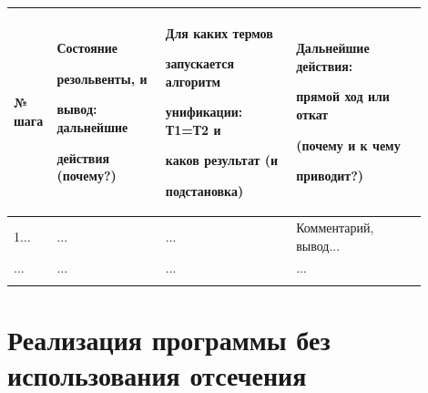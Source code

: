 \documentclass[a4paper,12pt]{article}
\begin{document}
	
	\begin{center}
	
	\begin{longtable}[h!]{|p{0.05\linewidth}|p{0.25\linewidth}|p{ 0.3\linewidth}|p{ 0.3\linewidth}|}
	
		\hline
	
		{№ шага} & {Состояние 
	
			
	
			резольвенты, и 
	
			
	
			вывод: дальнейшие 
	
			
	
			действия (почему?)} & {Для каких термов 
	
			
	
			запускается алгоритм 
	
			
	
			унификации: Т1=Т2 и 
	
			
	
			каков {\bf результат} (и 
	
			
	
			подстановка)} & {Дальнейшие действия: 
	
			
	
			прямой ход или откат 
	
			
	
			(почему и к чему 
	
			
	
			приводит?)}\\
	
		\hline
	
		{1...} & {...} & {...} & {Комментарий, вывод...}\\
	
		\hline
	
		{...} & {...} & {...} & {...}\\
	
		\hline
	
		\label{m1}
	
	\end{longtable}
	
\end{center}


	\newpage

	

	\section*{Реализация программы без использования отсечения}

	
\end{document}
